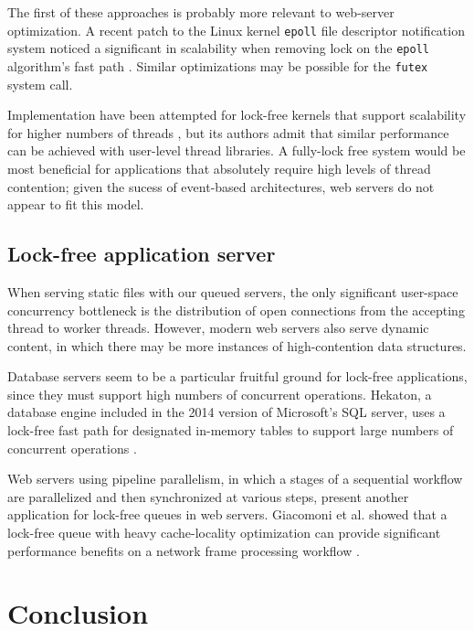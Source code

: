 \documentclass[twoside,10pt]{article}
\begin{document}
\begin{multicols}{2}
The first of these approaches is probably more relevant to web-server
optimization. A recent patch to the Linux kernel \verb+epoll+ file
descriptor notification system noticed a significant in scalability
when removing lock on the \verb+epoll+ algorithm's fast path
\cite{lockfree-epoll}. Similar optimizations may be possible for the
\verb+futex+ system call.

Implementation have been attempted for lock-free kernels that support
scalability for higher numbers of threads \cite{massalin1992lock}, but
its authors admit that similar performance can be achieved with
user-level thread libraries. A fully-lock free system would be most
beneficial for applications that absolutely require high levels of
thread contention; given the sucess of event-based architectures, web
servers do not appear to fit this model.

\subsection{Lock-free application server}

When serving static files with our queued servers, the only
significant user-space concurrency bottleneck is the distribution of
open connections from the accepting thread to worker threads. However,
modern web servers also serve dynamic content, in which there may be
more instances of high-contention data structures.

Database servers seem to be a particular fruitful ground for lock-free
applications, since they must support high numbers of concurrent
operations. Hekaton, a database engine included in the 2014 version of
Microsoft's SQL server, uses a lock-free fast path for designated
in-memory tables to support large numbers of concurrent operations
\cite{diaconu2013hekaton}.

Web servers using pipeline parallelism, in which a stages of a
sequential workflow are parallelized and then synchronized at various
steps, present another application for lock-free queues in web
servers. Giacomoni et al. showed that a lock-free queue with heavy
cache-locality optimization can provide significant performance
benefits on a network frame processing workflow
\cite{giacomoni2008fastforward}.

\section{Conclusion}


\end{multicols}
\end{document}
